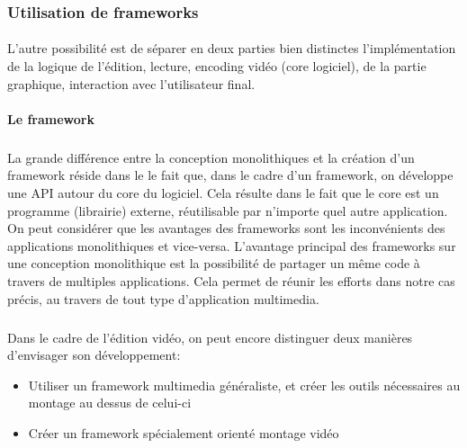 \subsubsection {Utilisation de  frameworks }

\paragraph{}

L'autre possibilité est de séparer en deux parties bien distinctes
l'implémentation de la logique de l'édition, lecture, encoding vidéo
(core logiciel), de la partie graphique, interaction avec l'utilisateur
final.

\newpage\paragraph {Le framework}

\subparagraph{}

La grande différence entre la conception monolithiques
 et la création d'un framework 
réside dans le le fait que, dans le cadre d'un framework, on développe
une API  autour du core du logiciel. Cela résulte dans le
fait que le core est un programme (librairie) externe, réutilisable par
n'importe quel autre application.  On peut considérer que les avantages
des frameworks sont les inconvénients des applications monolithiques
 et vice-versa. L'avantage principal des frameworks
sur une conception monolithique est la possibilité
de partager un même code à travers de multiples applications. Cela
permet de réunir les efforts dans notre cas précis, au travers de tout
type d'application multimedia.

\subparagraph{}

Dans le cadre de l'édition vidéo, on peut encore distinguer deux
manières d'envisager son développement:

\begin {itemize}

  \item {Utiliser un framework multimedia généraliste, et créer les
  outils nécessaires au montage au dessus de celui-ci}

  \item {Créer un framework spécialement orienté montage vidéo}

\end {itemize}

